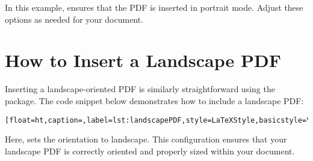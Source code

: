 		In this example,  ensures that the PDF is inserted in portrait mode.
		Adjust these options as needed for your document.

		
	\section{How to Insert a Landscape PDF}
		Inserting a landscape-oriented PDF is similarly straightforward using the  package. 
		The code snippet below demonstrates how to include a landscape PDF:

		\begin{lstlisting}[float=ht,caption=,label=lst:landscapePDF,style=LaTeXStyle,basicstyle=\ttfamily,]

		\end{lstlisting}

		Here,  sets the orientation to landscape. 
		This configuration ensures that your landscape PDF is correctly oriented and properly sized within your document.

		